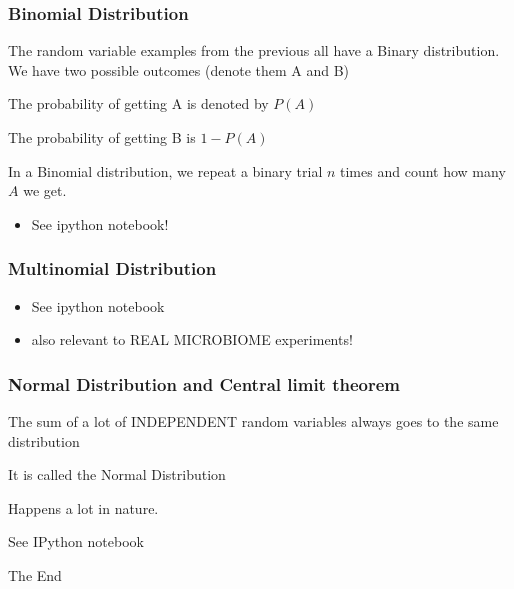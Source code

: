 \documentclass{beamer}
\begin{document}

\begin{frame}
\frametitle{Binomial Distribution}
The random variable examples from the previous all have a Binary distribution.
We have two possible outcomes (denote them A and B)

The probability of getting A is denoted by $P(A)$

The probability of getting B is $1-P(A)$

In a Binomial distribution, we repeat a binary trial $n$ times and count how many $A$ we get.

\begin{itemize}
\item See ipython notebook!
\end{itemize}
\end{frame}

\begin{frame}
\frametitle{Multinomial Distribution}
\begin{itemize}
\item See ipython notebook
\item also relevant to REAL MICROBIOME experiments!
\end{itemize}
\end{frame}

\begin{frame}
\frametitle{Normal Distribution and Central limit theorem}
The sum of a lot of INDEPENDENT random variables always goes to the same distribution

It is called the Normal Distribution

Happens a lot in nature.

See IPython notebook
\end{frame}


\begin{frame}
\Huge{\centerline{The End}}
\end{frame}

\end{document}
